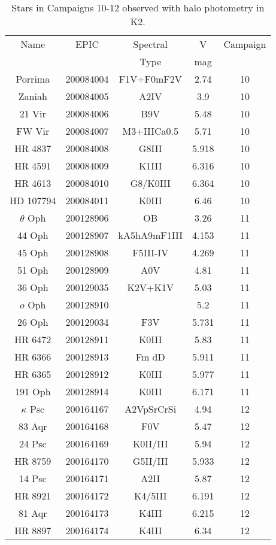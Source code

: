 \begin{table*}
\caption{Stars in Campaigns 10-12 observed with halo photometry in K2.\label{table_2}}
\begin{tabular}{ccccc}
\hline \hline
Name & EPIC & Spectral & V & Campaign \\
 &  & Type & mag &  \\
\hline
Porrima & 200084004 & F1V+F0mF2V & 2.74 & 10 \\
Zaniah & 200084005 & A2IV & 3.9 & 10 \\
21 Vir & 200084006 & B9V & 5.48 & 10 \\
FW Vir & 200084007 & M3+IIICa0.5 & 5.71 & 10 \\
HR 4837 & 200084008 & G8III & 5.918 & 10 \\
HR 4591 & 200084009 & K1III & 6.316 & 10 \\
HR 4613 & 200084010 & G8/K0III & 6.364 & 10 \\
HD 107794 & 200084011 & K0III & 6.46 & 10 \\
$\theta$ Oph & 200128906 & OB & 3.26 & 11 \\
44 Oph & 200128907 & kA5hA9mF1III & 4.153 & 11 \\
45 Oph & 200128908 & F5III-IV & 4.269 & 11 \\
51 Oph & 200128909 & A0V & 4.81 & 11 \\
36 Oph & 200129035 & K2V+K1V & 5.03 & 11 \\
$o$ Oph & 200128910 &  & 5.2 & 11 \\
26 Oph & 200129034 & F3V & 5.731 & 11 \\
HR 6472 & 200128911 & K0III & 5.83 & 11 \\
HR 6366 & 200128913 & Fm dD & 5.911 & 11 \\
HR 6365 & 200128912 & K0III & 5.977 & 11 \\
191 Oph & 200128914 & K0III & 6.171 & 11 \\
$\kappa$ Psc & 200164167 & A2VpSrCrSi & 4.94 & 12 \\
83 Aqr & 200164168 & F0V & 5.47 & 12 \\
24 Psc & 200164169 & K0II/III & 5.94 & 12 \\
HR 8759 & 200164170 & G5II/III & 5.933 & 12 \\
14 Psc & 200164171 & A2II & 5.87 & 12 \\
HR 8921 & 200164172 & K4/5III & 6.191 & 12 \\
81 Aqr & 200164173 & K4III & 6.215 & 12 \\
HR 8897 & 200164174 & K4III & 6.34 & 12 \\
\hline
\end{tabular}
\end{table*}
